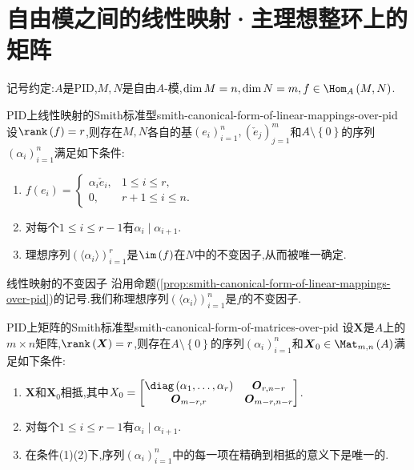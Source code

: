 \section{自由模之间的线性映射·主理想整环上的矩阵}

记号约定:$A$是PID,$M,N$是自由$A$-模,$\dim M=n,\dim N=m,f\in\Hom_{A}\left(M,N\right)$.

\begin{proposition}{PID上线性映射的Smith标准型}{smith-canonical-form-of-linear-mappings-over-pid}
	设$\rank\left(f\right)=r$,则存在$M,N$各自的基$\left(e_{i}\right)_{i=1}^{n},\left(\check{e}_{j}\right)_{j=1}^{m}$和$A\setminus\left\{0\right\}$的序列$\left(\alpha_{i}\right)_{i=1}^{n}$满足如下条件:
	\begin{enumerate}
		\item $f\left(e_{i}\right)=
		\begin{cases}
			\alpha_{i}\check{e}_{i},&1\leq i\leq r,\\
			0,&r+1\leq i\leq n.
		\end{cases}$
		\item 对每个$1\leq i\leq r-1$有$\alpha_{i}\mid\alpha_{i+1}$.
		\item 理想序列$\left(\langle\alpha_{i}\rangle\right)_{i=1}^{r}$是$\im\left(f\right)$在$N$中的不变因子,从而被唯一确定.
	\end{enumerate}
\end{proposition}

\begin{definition}{线性映射的不变因子}{}
	沿用命题(\cref{prop:smith-canonical-form-of-linear-mappings-over-pid})的记号.我们称理想序列$\left(\langle\alpha_{i}\rangle\right)_{i=1}^{n}$是$f$的不变因子.
\end{definition}

\begin{corollary}{PID上矩阵的Smith标准型}{smith-canonical-form-of-matrices-over-pid}
	设$\boldsymbol{X}$是$A$上的$m\times n$矩阵,$\rank\left(\boldsymbol{X}\right)=r$,则存在$A\setminus\left\{0\right\}$的序列$\left(\alpha_{i}\right)_{i=1}^{n}$和$\boldsymbol{X}_{0}\in\Mat_{m,n}\left(A\right)$满足如下条件:
	\begin{enumerate}
		\item $\boldsymbol{X}$和$\boldsymbol{X}_{0}$相抵,其中$X_{0}=\begin{bmatrix}
			\diag\left(\alpha_{1},\ldots,\alpha_{r}\right)&\boldsymbol{O}_{r,n-r}\\
			\boldsymbol{O}_{m-r,r}&\boldsymbol{O}_{m-r,n-r}
		\end{bmatrix}$.
		\item 对每个$1\leq i\leq r-1$有$\alpha_{i}\mid\alpha_{i+1}$.
		\item 在条件(1)(2)下,序列$\left(\alpha_{i}\right)_{i=1}^{n}$中的每一项在精确到相抵的意义下是唯一的.
	\end{enumerate}
\end{corollary}

